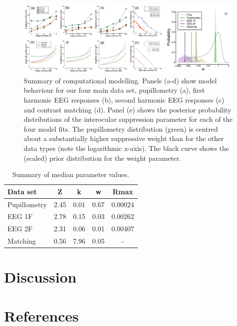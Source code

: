 \documentclass[
]{article}
\begin{document}
\begin{figure}

{\centering \includegraphics{Figures/modelfigure} 

}

\caption{Summary of computational modelling. Panels (a-d) show model behaviour for our four main data set, pupillometry (a), first harmonic EEG responses (b), second harmonic EEG responses (c) and contrast matching (d). Panel (e) shows the posterior probability distributions of the interocular suppression parameter for each of the four model fits. The pupillometry distribution (green) is centred about a substantially higher suppressive weight than for the other data types (note the logarithmic x-axis). The black curve shows the (scaled) prior distribution for the weight parameter.}\label{fig:modelfigure}
\end{figure}

\begin{table}

\caption{\label{tab:paramtable}Summary of median parameter values.}
\centering
\begin{tabular}[t]{l|c|c|c|c}
\hline
Data set & Z & k & w & Rmax\\
\hline
Pupillometry & 2.45 & 0.01 & 0.67 & 0.00024\\
\hline
EEG 1F & 2.78 & 0.15 & 0.03 & 0.00262\\
\hline
EEG 2F & 2.31 & 0.06 & 0.01 & 0.00407\\
\hline
Matching & 0.56 & 7.96 & 0.05 & -\\
\hline
\end{tabular}
\end{table}

\hypertarget{discussion}{%
\section{Discussion}\label{discussion}}

\hypertarget{references}{%
\section*{References}\label{references}}
\end{document}

